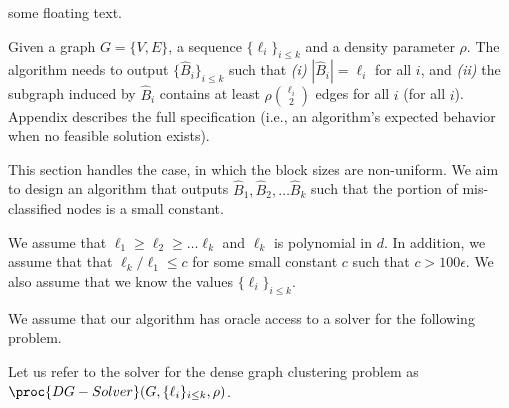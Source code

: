 
{\color{red} some floating text.}

 Given a graph $G = \{V, E\}$, a sequence $\{\ell_i\}_{i \leq k}$ and a density parameter $\rho.$ The algorithm needs to output $\{\hat B_i\}_{i \leq k}$ such that \emph{(i)} $|\hat B_i| = \ell_i$ for all $i$, and \emph{(ii)} the subgraph induced by $\hat B_i$ contains at least $\rho \binom{\ell_i}{2}$ edges for all $i$ (for all $i$). {\color{red} Appendix describes the full specification (i.e., an algorithm's expected behavior when no feasible solution exists).}


This section handles the case, in which the block sizes are non-uniform. We aim to design an algorithm that outputs $\hat B_1, \hat B_2, \dots \hat B_k$ such that the portion of mis-classified nodes is a small constant. 

We assume that $\ell_1 \geq \ell_2 \geq \dots \ell_k$ and $\ell_k$ is polynomial in $d$. In addition, we assume that that $\ell_k/\ell_1 \leq c$ for some small constant $c$ such that $c > 100 \epsilon$. We also assume that we know the values $\{\ell_i\}_{i \leq k}$. 

We assume that our algorithm has oracle access to a solver for the following problem. 

Let us refer to the solver for the dense graph clustering problem as $\proc{DG-Solver}(G, \{\ell_i\}_{i\leq k}, \rho)$. 
